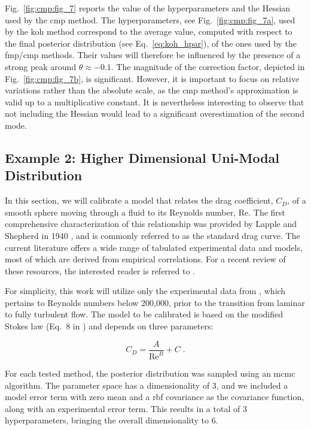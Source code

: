 Fig.~\ref{fig:cmp:fig_7} reports the value of the hyperparameters and the Hessian used by the \gls{cmp} method. The hyperparameters, see Fig.~\ref{fig:cmp:fig_7a}, used by the \gls{koh} method correspond to the average value, computed with respect to the final posterior distribution (see Eq.~\eqref{eq:koh_hpar}), of the ones used by the \gls{fmp}/\gls{cmp} methods. Their values will therefore be influenced by the presence of a strong peak around $\theta \approx -0.1$. The magnitude of the correction factor, depicted in Fig.~\ref{fig:cmp:fig_7b}, is significant. However, it is important to focus on relative variations rather than the absolute scale, as the \gls{cmp} method's approximation is valid up to a multiplicative constant. It is nevertheless interesting to observe that not including the Hessian would lead to a significant overestimation of the second mode. 

\subsection{Example 2: Higher Dimensional Uni-Modal Distribution}
\label{sc:cmp:test_case}

In this section, we will calibrate a model that relates the drag coefficient, $C_D$, of a smooth sphere moving through a fluid to its Reynolds number, Re. The first comprehensive characterization of this relationship was provided by Lapple and Shepherd in 1940 \cite{lapple_1940}, and is commonly referred to as the standard drag curve.
The current literature offers a wide range of tabulated experimental data and models, most of which are derived from empirical correlations. For a recent review of these resources, the interested reader is referred to \cite{gossens_2019}.

\smallskip
For simplicity, this work will utilize only the experimental data from \cite{lapple_1940}, which pertains to Reynolds numbers below 200,000, prior to the transition from laminar to fully turbulent flow. The model to be calibrated is based on the modified Stokes law (Eq.~8 in \cite{gossens_2019}) and depends on three parameters:

\begin{equation}
    C_D = \dfrac{A}{\text{Re}^B} + C \; .
    \label{eq:cmp:cd_model}
\end{equation}

\smallskip
For each tested method, the posterior distribution was sampled using an \gls{mcmc} algorithm. The parameter space has a dimensionality of 3, and we included a model error term with zero mean and a \gls{rbf} covariance as the covariance function, along with an experimental error term. This results in a total of 3 hyperparameters, bringing the overall dimensionality to 6.

